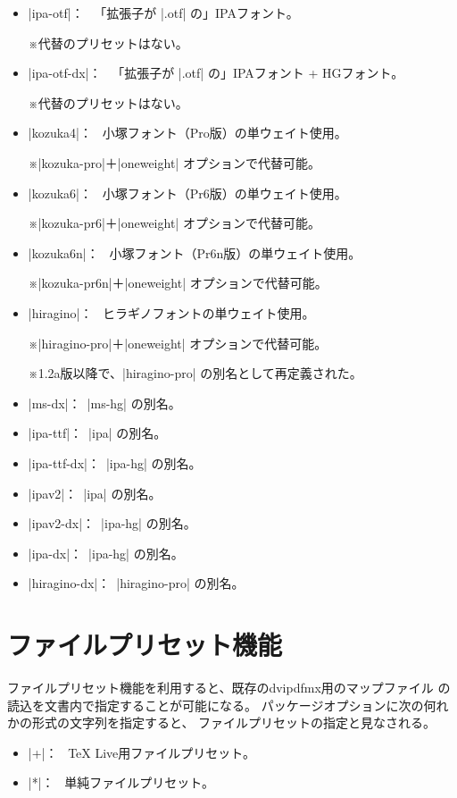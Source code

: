 \documentclass[uplatex,dvipdfmx,a4paper]{jsarticle}
\newcommand{\Note}{\par\noindent ※}
\newcommand{\Means}{：\ }
\begin{document}
\begin{itemize}
\item |ipa-otf|\Means
  「拡張子が |.otf| の」IPAフォント。
  \Note 代替のプリセットはない。
\item |ipa-otf-dx|\Means
  「拡張子が |.otf| の」IPAフォント + HGフォント。
  \Note 代替のプリセットはない。
\item |kozuka4|\Means
  小塚フォント（Pro版）の単ウェイト使用。
  \Note |kozuka-pro|＋|oneweight| オプションで代替可能。
\item |kozuka6|\Means
  小塚フォント（Pr6版）の単ウェイト使用。
  \Note |kozuka-pr6|＋|oneweight| オプションで代替可能。
\item |kozuka6n|\Means
  小塚フォント（Pr6n版）の単ウェイト使用。
  \Note |kozuka-pr6n|＋|oneweight| オプションで代替可能。
\item |hiragino|\Means
  ヒラギノフォントの単ウェイト使用。
  \Note |hiragino-pro|＋|oneweight| オプションで代替可能。
  \Note 1.2a版以降で、|hiragino-pro| の別名として再定義された。
\item |ms-dx|\Means |ms-hg| の別名。
\item |ipa-ttf|\Means |ipa| の別名。
\item |ipa-ttf-dx|\Means |ipa-hg| の別名。
\item |ipav2|\Means |ipa| の別名。
\item |ipav2-dx|\Means |ipa-hg| の別名。
\item |ipa-dx|\Means |ipa-hg| の別名。
\item |hiragino-dx|\Means |hiragino-pro| の別名。
\end{itemize}

\section{ファイルプリセット機能}
\label{sec:FilePreset}

ファイルプリセット機能を利用すると、既存のdvipdfmx用のマップファイル
の読込を文書内で指定することが可能になる。
パッケージオプションに次の何れかの形式の文字列を指定すると、
ファイルプリセットの指定と見なされる。

\begin{itemize}
\item |+|\mbox{}\Means
  {\TeX} Live用ファイルプリセット。
\item |*|\mbox{}\Means
  単純ファイルプリセット。
\end{itemize}
\end{document}

